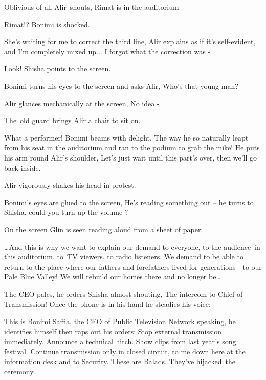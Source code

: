 \documentclass[12pt]{book}
\begin{document}
Oblivious of all Alir~shouts, {\textquotedbl}Rimat is in the auditorium --{\textquotedbl}

{\textquotedbl}Rimat!?{\textquotedbl} Bonimi is shocked.

{\textquotedbl}She's waiting for me to correct the third line,{\textquotedbl} Alir explains as if it's self-evident,
{\textquotedbl}and I'm completely mixed up... I forgot what the correction was -{\textquotedbl}

{\textquotedbl}Look!{\textquotedbl} Shisha points to the screen.

Bonimi turns his eyes to the screen and asks Alir, {\textquotedbl}Who's that young man?{\textquotedbl}

Alir glances mechanically at the screen, {\textquotedbl}No idea -{\textquotedbl}

The~old guard brings Alir a chair to sit on.

{\textquotedbl}What a performer!{\textquotedbl} Bonimi beams with delight. {\textquotedbl}The way he so naturally leapt
from his seat in the auditorium and ran to the podium to grab the mike!{\textquotedbl} He puts his arm round Alir's
shoulder, {\textquotedbl}Let's just wait until this part's over, then we'll go back inside.{\textquotedbl}

Alir vigorously shakes his head in protest.

Bonimi's eyes are glued to the screen, {\textquotedbl}He's reading something out --{\textquotedbl} he turns to Shisha,
{\textquotedbl}could you turn up the volume ?{\textquotedbl}

On the screen Glin is seen reading aloud from a sheet of paper:

{\textquotedbl}{\dots}And this is why we want to explain our demand to everyone, to the audience~in this auditorium,
to~TV viewers, to radio listeners. We demand to be able to return to the place where our fathers and forefathers lived
for generations - to our Pale Blue Valley! We will rebuild our homes there and no longer be{\dots}{\textquotedbl}

The CEO pales, he orders Shisha almost shouting, {\textquotedbl}The intercom to Chief of Transmission!{\textquotedbl}
Once the phone is in his hand he steadies his voice:

{\textquotedbl}This is Bonimi Saffia, the CEO of Public Television Network speaking,{\textquotedbl} he identifies
himself then raps out his orders: {\textquotedbl}Stop external transmission immediately. Announce a technical hitch.
Show clips from last year's song festival. Continue transmission only in closed circuit, to me down here at the
information desk and to Security. These are Balads. They've hijacked~the ceremony.{\textquotedbl}~~~~~~
\end{document}
